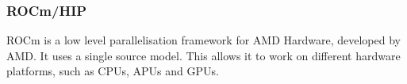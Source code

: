 



 




\subsubsection{ROCm/HIP}
ROCm is a low level parallelisation framework for AMD Hardware, developed by AMD.
It uses a single source model.
This allows it to work on different hardware platforms, such as CPUs, APUs and GPUs.

